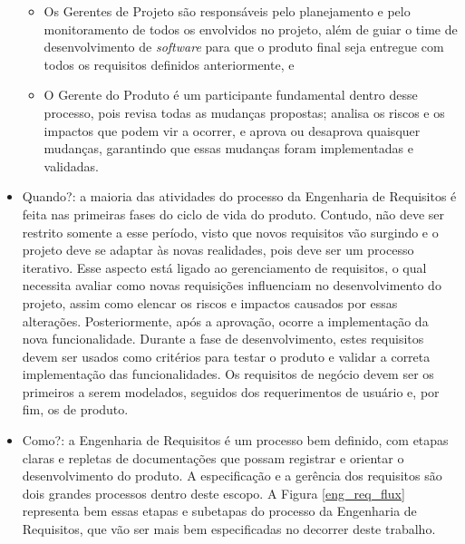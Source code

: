 \begin{itemize}
\begin{itemize}
        \item Os Gerentes de Projeto são responsáveis pelo planejamento e pelo monitoramento de todos os envolvidos no projeto, além de guiar o time de desenvolvimento de \textit{software} para que o produto final seja entregue com todos os requisitos definidos anteriormente, e
    
        \item O Gerente do Produto é um participante fundamental dentro desse processo, pois revisa todas as mudanças propostas; analisa os riscos e os impactos que podem vir a ocorrer, e aprova ou desaprova quaisquer mudanças, garantindo que essas mudanças foram implementadas e validadas.
    \end{itemize}
    
    \item Quando?: a maioria das atividades do processo da Engenharia de Requisitos é feita nas primeiras fases do ciclo de vida do produto. Contudo, não deve ser restrito somente a esse período, visto que novos requisitos vão surgindo e o projeto deve se adaptar às novas realidades, pois deve ser um processo iterativo. Esse aspecto está ligado ao gerenciamento de requisitos, o qual necessita avaliar como novas requisições influenciam no desenvolvimento do projeto, assim como elencar os riscos e impactos causados por essas alterações. Posteriormente, após a aprovação, ocorre a implementação da nova funcionalidade. Durante a fase de desenvolvimento, estes requisitos devem ser usados como critérios para testar o produto e validar a correta implementação das funcionalidades. Os requisitos de negócio devem ser os primeiros a serem modelados, seguidos dos requerimentos de usuário e, por fim, os de produto.
    
    \item Como?: a Engenharia de Requisitos é um processo bem definido, com etapas claras e repletas de documentações que possam registrar e orientar o desenvolvimento do produto. A especificação e a gerência dos requisitos são dois grandes processos dentro deste escopo. A Figura \ref{eng_req_flux} representa bem essas etapas e subetapas do processo da Engenharia de Requisitos, que vão ser mais bem especificadas no decorrer deste trabalho.
    

\end{itemize}
